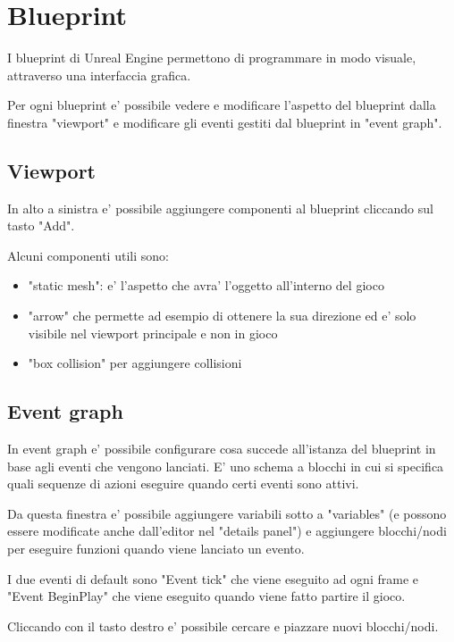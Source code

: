 
\chapter{Blueprint}

    I blueprint di Unreal Engine permettono di programmare in modo visuale, attraverso una interfaccia grafica.

    Per ogni blueprint e' possibile vedere e modificare l'aspetto del blueprint dalla finestra "viewport" e modificare gli eventi gestiti dal blueprint in "event graph".


    \section{Viewport}
        In alto a sinistra e' possibile aggiungere componenti al blueprint cliccando sul tasto "Add".

        Alcuni componenti utili sono:
        \begin{itemize}
            \item "static mesh": e' l'aspetto che avra' l'oggetto all'interno del gioco
            \item "arrow" che permette ad esempio di ottenere la sua direzione ed e' solo visibile nel viewport principale e non in gioco
            \item "box collision" per aggiungere collisioni
        \end{itemize}


    \section{Event graph}

        In event graph e' possibile configurare cosa succede all'istanza del blueprint in base agli eventi che vengono lanciati.
        E' uno schema a blocchi in cui si specifica quali sequenze di azioni eseguire quando certi eventi sono attivi.

        Da questa finestra e' possibile aggiungere variabili sotto a "variables" (e possono essere modificate anche dall'editor nel "details panel")
        e aggiungere blocchi/nodi per eseguire funzioni quando viene lanciato un evento.

        I due eventi di default sono "Event tick" che viene eseguito ad ogni frame e "Event BeginPlay" che viene eseguito quando viene fatto partire il gioco.

        Cliccando con il tasto destro e' possibile cercare e piazzare nuovi blocchi/nodi.

